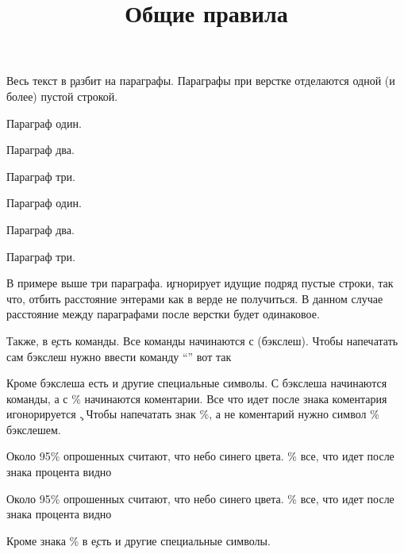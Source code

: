 \title{Общие правила}

Весь текст в \c разбит на параграфы. Параграфы при верстке отделаются
одной (и более) пустой строкой.

 \hfill
\startTEX
Параграф один.

Параграф два.


Параграф три.
\stopTEX
\stopdescr

 \hfill
\startCODERESULT
Параграф один.

Параграф два.


Параграф три.
\stopCODERESULT
\stopdescr

В примере выше три параграфа. \c игнорирует идущие подряд пустые строки, так
что, отбить расстояние энтерами как в верде не получиться. В данном случае
расстояние между параграфами после верстки будет одинаковое.

Также, в \c есть команды. Все команды начинаются с \tex{} (бэкслеш). Чтобы
напечатать сам бэкслеш нужно ввести команду ``'' вот так

\vbox{
 \hfill
\startTEX
\tex{}
\stopTEX
\stopdescr
}

\vbox{
 \hfill
\startCODERESULT
\tex{}
\stopCODERESULT
\stopdescr
}

Кроме бэкслеша есть и другие специальные символы. С бэкслеша начинаются команды,
а с \% начинаются коментарии. Все что идет после знака коментария
игонорируется \c. Чтобы напечатать знак \%, а не коментарий
нужно  символ \% бэкслешем.

 \hfill
\startTEX
Около 95\% опрошенных считают, что небо синего цвета.
\% все, что идет после знака процента видно
\stopTEX
\stopdescr

 \hfill
\startCODERESULT
Около 95\% опрошенных считают, что небо синего цвета.
\% все, что идет после знака процента видно
\stopCODERESULT
\stopdescr

Кроме знака \% в \c есть и другие специальные символы.

